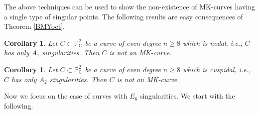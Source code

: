 \documentclass[11pt]{amsart}
\theoremstyle{plain}
\newtheorem{corollary}[thm]{Corollary}
\theoremstyle{definition}
\numberwithin{equation}{section}
\begin{document}
The above techniques can be used to show the non-existence of MK-curves having a single type of singular points. The following results are easy consequences of Theorem \ref{BMYoct}.

\begin{corollary}
\label{corA1}
Let $C \subset \mathbb{P}^{2}_{\mathbb{C}}$ be a  curve of even degree $n \geq 8$ which is nodal, i.e., $C$ has only $A_1$ singularities. Then $C$ is not an  MK-curve. 
\end{corollary}

\begin{corollary}
\label{corA2}
Let $C \subset \mathbb{P}^{2}_{\mathbb{C}}$ be a curve of even degree $n \geq 8$ which is cuspidal, i.e., $C$ has only $A_2$ singularities. Then $C$ is not an MK-curve. 
\end{corollary}


Now we focus on the case of curves with $E_{6}$ singularities. We start with the following.
\end{document}
